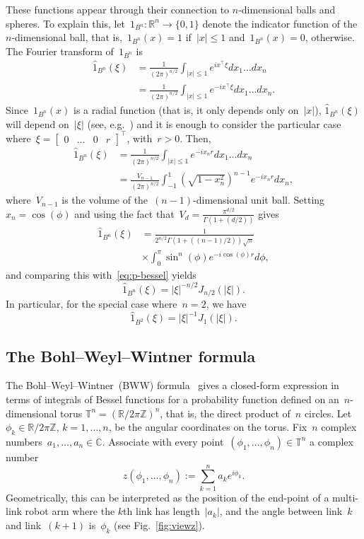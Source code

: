 \documentclass[final ]{IEEEtran}
\newcommand {\R}{\mathbb R}
\newcommand {\C}{\mathbb C}
\newcommand {\T}{\mathbb T^n}
\newcommand{\be}{\begin{equation}}
\newcommand{\ee}{\end{equation}}
\newcommand{\Z}{\mathbb Z}
\begin{document}
These functions appear 
through their connection to   
$n$-dimensional balls and spheres. To explain this,
let~$1_{B^n}:\R^n\to\{0,1\}$ denote the  indicator function of the $n$-dimensional ball, that is,~$1_{B^n}(x)=1$ if~$|x|\leq 1$ and~$1_{B^n}(x)=0$, otherwise.  The Fourier transform of~$1_{B^n}$  is
\begin{align}\label{eq:four_ball}
\hat 1_{B^n}(\xi)&= \frac1{(2\pi)^{n/2}}
\int_{|x|\leq 1} e^{i x^\top  \xi } dx_1\dots dx_n\nonumber\\& = \frac1{(2\pi)^{n/2}}
\int_{|x|\leq 1} e^{-i x^\top  \xi } dx_1\dots dx_n . 
\end{align}
Since~$1_{B^n}(x)$ is a radial function (that is, it only depends only on~$|x|$),
$\hat 1_{B^n}(\xi)$ will   depend on~$|\xi|$ (see, e.g.~\cite[Chapter~IV]{Four_intro}) and it is
  enough  to consider the particular
  case where~$\xi=\begin{bmatrix}
0&\dots&0&r
\end{bmatrix}^\top$,
with~$r>0$. Then,
\begin{align*}
  \hat 1_{B^n}(\xi)&
 = \frac1{(2\pi)^{n/2}} \int_{|x|\leq 1}  e^{-i x_n r} dx_1 \dots dx_n\\
  &=  \frac { V_{n-1}}{(2\pi)^{n/2}}
  \int_{-1}^1 (\sqrt{ 1-x_n^2})^{n-1 }  e^{-i x_n r} dx_n,
\end{align*}
where~$V_{n-1} $ is the volume of the~$(n-1)$-dimensional unit ball.
Setting~$x_n= \cos (\phi)$ and using the fact  that~$V_d=\frac{\pi^{d/2}} { \Gamma(1+(d/2)) } $ gives
   \begin{align*}
  \hat 1_{B^n}(\xi)
  &=  \frac{ 1}{ 2 ^{n/2} \Gamma(1+((n-1)/2))\sqrt{\pi}}
 \\& \times  \int_{0}^\pi \sin^{n}(\phi)    e^{-i \cos(\phi)  r} d \phi ,
\end{align*}
and comparing this with~\eqref{eq:p-bessel} yields
\[ 
 \hat 1_{B^n}(\xi)  = |\xi|^{-n/2}J_{n/2}(|\xi|).
 \]
In particular, for the special case where~$n=2$, we have
\be\label{eq:ind_func_B2}
 \hat 1_{B^2}(\xi)  = |\xi|^{-1}J_{1}(|\xi|).
 \ee


\subsection{The Bohl--Weyl--Wintner formula}
The Bohl--Weyl--Wintner~(BWW) formula~\cite{Wintner-1933} 
gives a closed-form expression in terms of integrals of Bessel functions 
for a   probability function defined on an~$n$-dimensional torus $\T=(\R/2\pi\Z)^n$, that is, the direct product of~$n$ circles.  Let~$\phi_k\in \R/2\pi\Z$, $k=1,\dots,n$, be the angular coordinates on the torus.
Fix~$n$ complex numbers~$a_1,\dots,a_n\in\C$. Associate with every point~$(\phi_1,\dots,\phi_n)\in\T$
  a complex number
\[
z(\phi_1,\dots,\phi_n):=\sum _{k=1}^n a_ke^{i\phi_k}.
\]
Geometrically, this can be interpreted as
the position of the end-point of a multi-link robot arm  where the $k$th  link has length~$|a_k|$, and the
angle between link~$k$
and link~$(k+1)$ is~$\phi_k $ (see Fig.~\ref{fig:viewz}).
\end{document}
